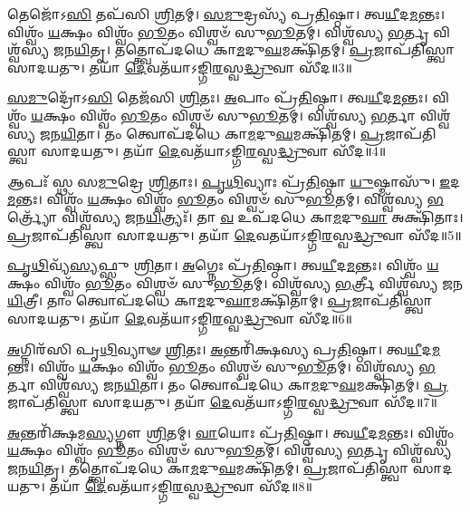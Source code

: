    𑌤𑍇𑌜𑍋᳴𑌽\-\ul{𑌸𑌿} 𑌤𑌪᳴𑌸𑌿 \ul{𑌶𑍍𑌰𑌿}\-𑌤𑌮𑍍।
   \ul{𑌸}\-\-\ul{𑌮𑍁}\-𑌦𑍍𑌰𑌸𑍍𑌯᳴ 𑌪𑍍𑌰\-\ul{𑌤𑌿}\-𑌷𑍍𑌠𑌾।
   𑌤𑍍𑌵\-\ul{𑌯𑍀}\-𑌦\-\ul{𑌮}\-𑌨𑍍𑌤𑌃।
   𑌵𑌿𑌶𑍍𑌵𑌂᳴ \ul{𑌯}\-𑌕𑍍𑌷𑌂 𑌵𑌿𑌶𑍍𑌵𑌂᳴ \ul{𑌭𑍂}\-𑌤𑌂 𑌵𑌿𑌶𑍍𑌵𑍞᳴ 𑌸𑍁\-\ul{𑌭𑍂}\-𑌤𑌮𑍍।
   𑌵𑌿𑌶𑍍𑌵᳴𑌸𑍍𑌯 \ul{𑌭}\-𑌰𑍍𑌤𑍃 𑌵𑌿𑌶𑍍𑌵᳴𑌸𑍍𑌯 𑌜𑌨\-\ul{𑌯𑌿}\-𑌤𑍃।
   𑌤𑌤𑍍𑌤𑍍𑌵𑍋𑌪᳴𑌦𑌧𑍇 𑌕𑌾\-\ul{𑌮}\-𑌦𑍁\-\ul{𑌘}\-𑌮𑌕𑍍𑌷𑌿᳴𑌤𑌮𑍍।
   \ul{𑌪𑍍𑌰}\-𑌜𑌾𑌪᳴𑌤𑌿𑌸𑍍𑌤𑍍𑌵𑌾 𑌸𑌾𑌦𑌯𑌤𑍁।
   𑌤𑌯𑌾᳴ \ul{𑌦𑍇}\-𑌵𑌤᳴𑌯𑌾𑌽𑌙𑍍𑌗𑌿\-\ul{𑌰}\-𑌸𑍍𑌵\-\ul{𑌦𑍍𑌧𑍍𑌰𑍁}\-𑌵𑌾 𑌸𑍀᳴𑌦॥3॥

   \ul{𑌸}\-\-\ul{𑌮𑍁}\-𑌦𑍍𑌰𑍋᳴𑌽\-\ul{𑌸𑌿} 𑌤𑍇𑌜᳴𑌸𑌿 \ul{𑌶𑍍𑌰𑌿}\-𑌤𑌃।
   \ul{𑌅}\-𑌪𑌾𑌂 𑌪𑍍𑌰᳴\-\ul{𑌤𑌿}\-𑌷𑍍𑌠𑌾।
   𑌤𑍍𑌵\-\ul{𑌯𑍀}\-𑌦\-\ul{𑌮}\-𑌨𑍍𑌤𑌃।
   𑌵𑌿𑌶𑍍𑌵𑌂᳴ \ul{𑌯}\-𑌕𑍍𑌷𑌂 𑌵𑌿𑌶𑍍𑌵𑌂᳴ \ul{𑌭𑍂}\-𑌤𑌂 𑌵𑌿𑌶𑍍𑌵𑍞᳴ 𑌸𑍁\-\ul{𑌭𑍂}\-𑌤𑌮𑍍।
   𑌵𑌿𑌶𑍍𑌵᳴𑌸𑍍𑌯 \ul{𑌭}\-𑌰𑍍𑌤𑌾 𑌵𑌿𑌶𑍍𑌵᳴𑌸𑍍𑌯 𑌜𑌨\-\ul{𑌯𑌿}\-𑌤𑌾।
   𑌤𑌂 𑌤𑍍𑌵𑍋𑌪᳴𑌦𑌧𑍇 𑌕𑌾\-\ul{𑌮}\-𑌦𑍁\-\ul{𑌘}\-𑌮𑌕𑍍𑌷𑌿᳴𑌤𑌮𑍍।
   \ul{𑌪𑍍𑌰}\-𑌜𑌾𑌪᳴𑌤𑌿𑌸𑍍𑌤𑍍𑌵𑌾 𑌸𑌾𑌦𑌯𑌤𑍁।
   𑌤𑌯𑌾᳴ \ul{𑌦𑍇}\-𑌵𑌤᳴𑌯𑌾𑌽𑌙𑍍𑌗𑌿\-\ul{𑌰}\-𑌸𑍍𑌵\-\ul{𑌦𑍍𑌧𑍍𑌰𑍁}\-𑌵𑌾 𑌸𑍀᳴𑌦॥4॥

   𑌆𑌪𑌃᳴ 𑌸𑍍𑌥 𑌸\-\ul{𑌮𑍁}\-𑌦𑍍𑌰𑍇 \ul{𑌶𑍍𑌰𑌿}\-𑌤𑌾𑌃।
   \ul{𑌪𑍃}\-\-\ul{𑌥𑌿}\-𑌵𑍍𑌯𑌾𑌃 𑌪𑍍𑌰᳴\-\ul{𑌤𑌿}\-𑌷𑍍𑌠𑌾 \ul{𑌯𑍁}\-𑌷𑍍𑌮𑌾𑌸𑍁᳴।
   \ul{𑌇}\-𑌦\-\ul{𑌮}\-𑌨𑍍𑌤𑌃।
   𑌵𑌿𑌶𑍍𑌵𑌂᳴ \ul{𑌯}\-𑌕𑍍𑌷𑌂 𑌵𑌿𑌶𑍍𑌵𑌂᳴ \ul{𑌭𑍂}\-𑌤𑌂 𑌵𑌿𑌶𑍍𑌵𑍞᳴ 𑌸𑍁\-\ul{𑌭𑍂}\-𑌤𑌮𑍍।
   𑌵𑌿𑌶𑍍𑌵᳴𑌸𑍍𑌯 \ul{𑌭}\-𑌰𑍍𑌤𑍍𑌰𑍍𑌯𑍋᳴ 𑌵𑌿𑌶𑍍𑌵᳴𑌸𑍍𑌯 𑌜𑌨\-\ul{𑌯𑌿}\-𑌤𑍍𑌰𑍍𑌯𑌃᳴।
   𑌤𑌾 \ul{𑌵} 𑌉𑌪᳴𑌦𑌧𑍇 𑌕𑌾\-\ul{𑌮}\-𑌦𑍁\-\ul{𑌘𑌾} 𑌅𑌕𑍍𑌷𑌿᳴𑌤𑌾𑌃।
   \ul{𑌪𑍍𑌰}\-𑌜𑌾𑌪᳴𑌤𑌿𑌸𑍍𑌤𑍍𑌵𑌾 𑌸𑌾𑌦𑌯𑌤𑍁।
   𑌤𑌯𑌾᳴ \ul{𑌦𑍇}\-𑌵𑌤𑌯𑌾᳴𑌽𑌙𑍍𑌗𑌿\-\ul{𑌰}\-𑌸𑍍𑌵\-\ul{𑌦𑍍𑌧𑍍𑌰𑍁}\-𑌵𑌾 𑌸𑍀᳴𑌦॥5॥

   \ul{𑌪𑍃}\-\-\ul{𑌥𑌿}\-𑌵𑍍𑌯᳴\-\ul{𑌸𑍍𑌯}\-𑌫𑍍𑌸𑍁 \ul{𑌶𑍍𑌰𑌿}\-𑌤𑌾।
   \ul{𑌅}\-𑌗𑍍𑌨𑍇𑌃 𑌪𑍍𑌰᳴\-\ul{𑌤𑌿}\-𑌷𑍍𑌠𑌾।
   𑌤𑍍𑌵\-\ul{𑌯𑍀}\-𑌦\-\ul{𑌮}\-𑌨𑍍𑌤𑌃।
   𑌵𑌿𑌶𑍍𑌵𑌂᳴ \ul{𑌯}\-𑌕𑍍𑌷𑌂 𑌵𑌿𑌶𑍍𑌵𑌂᳴ \ul{𑌭𑍂}\-𑌤𑌂 𑌵𑌿𑌶𑍍𑌵𑍞᳴ 𑌸𑍁\-\ul{𑌭𑍂}\-𑌤𑌮𑍍।
   𑌵𑌿𑌶𑍍𑌵᳴𑌸𑍍𑌯 \ul{𑌭}\-𑌰𑍍𑌤𑍍𑌰𑍀 𑌵𑌿𑌶𑍍𑌵᳴𑌸𑍍𑌯 𑌜𑌨\-\ul{𑌯𑌿}\-𑌤𑍍𑌰𑍀।
   𑌤𑌾𑌂 𑌤𑍍𑌵𑍋𑌪᳴𑌦𑌧𑍇 𑌕𑌾\-\ul{𑌮}\-𑌦𑍁\-\ul{𑌘𑌾}\-𑌮𑌕𑍍𑌷𑌿᳴𑌤𑌾𑌮𑍍।
   \ul{𑌪𑍍𑌰}\-𑌜𑌾𑌪᳴𑌤𑌿𑌸𑍍𑌤𑍍𑌵𑌾 𑌸𑌾𑌦𑌯𑌤𑍁।
   𑌤𑌯𑌾᳴ \ul{𑌦𑍇}\-𑌵𑌤᳴𑌯𑌾𑌽𑌙𑍍𑌗𑌿\-\ul{𑌰}\-𑌸𑍍𑌵\-\ul{𑌦𑍍𑌧𑍍𑌰𑍁}\-𑌵𑌾 𑌸𑍀᳴𑌦॥6॥

   \ul{𑌅}\-𑌗𑍍𑌨𑌿𑌰᳴𑌸𑌿 𑌪𑍃\-\ul{𑌥𑌿}\-𑌵𑍍𑌯𑌾𑍟 \ul{𑌶𑍍𑌰𑌿}\-𑌤𑌃।
   \ul{𑌅}\-𑌨𑍍𑌤𑌰𑌿᳴𑌕𑍍𑌷𑌸𑍍𑌯 𑌪𑍍𑌰\-\ul{𑌤𑌿}\-𑌷𑍍𑌠𑌾।
   𑌤𑍍𑌵\-\ul{𑌯𑍀}\-𑌦\-\ul{𑌮}\-𑌨𑍍𑌤𑌃।
   𑌵𑌿𑌶𑍍𑌵𑌂᳴ \ul{𑌯}\-𑌕𑍍𑌷𑌂 𑌵𑌿𑌶𑍍𑌵𑌂᳴ \ul{𑌭𑍂}\-𑌤𑌂 𑌵𑌿𑌶𑍍𑌵𑍞᳴ 𑌸𑍁\-\ul{𑌭𑍂}\-𑌤𑌮𑍍।
   𑌵𑌿𑌶𑍍𑌵᳴𑌸𑍍𑌯 \ul{𑌭}\-𑌰𑍍𑌤𑌾 𑌵𑌿𑌶𑍍𑌵᳴𑌸𑍍𑌯 𑌜𑌨\-\ul{𑌯𑌿}\-𑌤𑌾।
   𑌤𑌂 𑌤𑍍𑌵𑍋𑌪᳴𑌦𑌧𑍇 𑌕𑌾\-\ul{𑌮}\-𑌦𑍁\-\ul{𑌘}\-𑌮𑌕𑍍𑌷𑌿᳴𑌤𑌮𑍍।
   \ul{𑌪𑍍𑌰}\-𑌜𑌾𑌪᳴𑌤𑌿𑌸𑍍𑌤𑍍𑌵𑌾 𑌸𑌾𑌦𑌯𑌤𑍁।
   𑌤𑌯𑌾᳴ \ul{𑌦𑍇}\-𑌵𑌤᳴𑌯𑌾𑌽𑌙𑍍𑌗𑌿\-\ul{𑌰}\-𑌸𑍍𑌵\-\ul{𑌦𑍍𑌧𑍍𑌰𑍁}\-𑌵𑌾 𑌸𑍀᳴𑌦॥7॥

   \ul{𑌅}\-𑌨𑍍𑌤𑌰𑌿᳴𑌕𑍍𑌷𑌮\-\ul{𑌸𑍍𑌯}\-𑌗𑍍𑌨𑍗 \ul{𑌶𑍍𑌰𑌿}\-𑌤𑌮𑍍।
   \ul{𑌵𑌾}\-𑌯𑍋𑌃 𑌪𑍍𑌰᳴\-\ul{𑌤𑌿}\-𑌷𑍍𑌠𑌾।
   𑌤𑍍𑌵\-\ul{𑌯𑍀}\-𑌦\-\ul{𑌮}\-𑌨𑍍𑌤𑌃।
   𑌵𑌿𑌶𑍍𑌵𑌂᳴ \ul{𑌯}\-𑌕𑍍𑌷𑌂 𑌵𑌿𑌶𑍍𑌵𑌂᳴ \ul{𑌭𑍂}\-𑌤𑌂 𑌵𑌿𑌶𑍍𑌵𑍞᳴ 𑌸𑍁\-\ul{𑌭𑍂}\-𑌤𑌮𑍍।
   𑌵𑌿𑌶𑍍𑌵᳴𑌸𑍍𑌯 \ul{𑌭}\-𑌰𑍍𑌤𑍃 𑌵𑌿𑌶𑍍𑌵᳴𑌸𑍍𑌯 𑌜𑌨\-\ul{𑌯𑌿}\-𑌤𑍃।
   𑌤𑌤𑍍𑌤𑍍𑌵𑍋𑌪᳴𑌦𑌧𑍇 𑌕𑌾\-\ul{𑌮}\-𑌦𑍁\-\ul{𑌘}\-𑌮𑌕𑍍𑌷𑌿᳴𑌤𑌮𑍍।
   \ul{𑌪𑍍𑌰}\-𑌜𑌾𑌪᳴𑌤𑌿𑌸𑍍𑌤𑍍𑌵𑌾 𑌸𑌾𑌦𑌯𑌤𑍁।
   𑌤𑌯𑌾᳴ \ul{𑌦𑍇}\-𑌵𑌤᳴𑌯𑌾𑌽𑌙𑍍𑌗𑌿\-\ul{𑌰}\-𑌸𑍍𑌵\-\ul{𑌦𑍍𑌧𑍍𑌰𑍁}\-𑌵𑌾 𑌸𑍀᳴𑌦॥8॥

